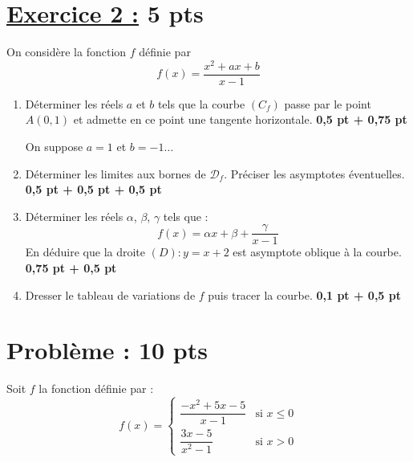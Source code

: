 \documentclass[12pt,a4paper]{article}
\begin{document}
\section*{\underline{Exercice 2 :} 5 pts }

On considère la fonction \( f \) définie par 
\[
f(x) = \frac{x^2 + ax + b}{x - 1}
\]

\begin{enumerate}
    \item Déterminer les réels \( a \) et \( b \) tels que la courbe \( (C_f) \) passe par le point \( A(0,1) \) et admette en ce point une tangente horizontale. \hfill \textbf{0{,}5 pt + 0{,}75 pt}
    
    On suppose \( a = 1 \) et \( b = -1 \dots \)
    
    \item Déterminer les limites aux bornes de \( \mathcal{D}_f \). Préciser les asymptotes éventuelles. \hfill \textbf{0{,}5 pt + 0{,}5 pt + 0{,}5 pt}
    
    \item Déterminer les réels \( \alpha \), \( \beta \), \( \gamma \) tels que :
    \[
    f(x) = \alpha x + \beta + \frac{\gamma}{x - 1}
    \]
    En déduire que la droite \( (D) : y = x + 2 \) est asymptote oblique à la courbe. \hfill \textbf{0{,}75 pt + 0{,}5 pt}
    
    \item Dresser le tableau de variations de \( f \) puis tracer la courbe. \hfill \textbf{0{,}1 pt + 0{,}5 pt}
\end{enumerate}

\section*{Problème : 10 pts}

Soit \( f \) la fonction définie par :
\[
f(x) = 
\begin{cases}
\dfrac{-x^2 + 5x - 5}{x - 1} & \text{si } x \leq 0 \\
\dfrac{3x - 5}{x^2 - 1} & \text{si } x > 0
\end{cases}
\]
\end{document}
